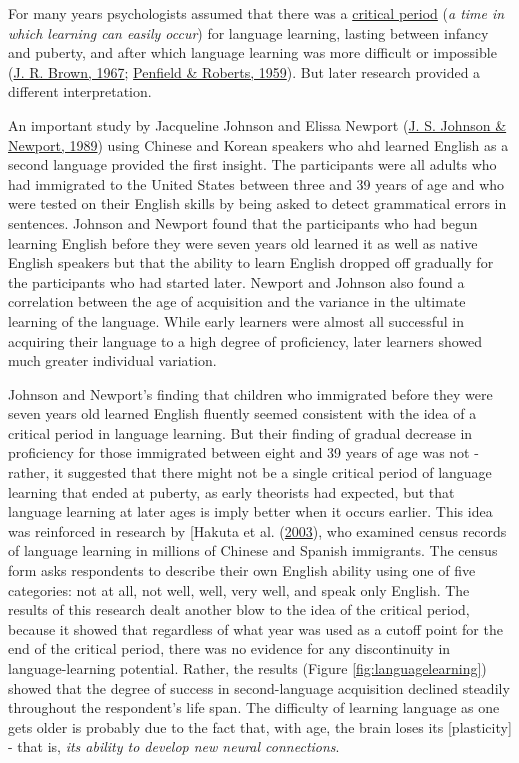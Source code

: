 \documentclass[
]{krantz}
\begin{document}
For many years psychologists assumed that there was a \protect\hyperlink{critical-period}{critical period} (\emph{a time in which learning can easily occur}) for language learning, lasting between infancy and puberty, and after which language learning was more difficult or impossible (\protect\hyperlink{ref-brown1967}{J. R. Brown, 1967}; \protect\hyperlink{ref-Penfield1959}{Penfield \& Roberts, 1959}). But later research provided a different interpretation.

An important study by Jacqueline Johnson and Elissa Newport (\protect\hyperlink{ref-Johnson1989}{J. S. Johnson \& Newport, 1989}) using Chinese and Korean speakers who ahd learned English as a second language provided the first insight. The participants were all adults who had immigrated to the United States between three and 39 years of age and who were tested on their English skills by being asked to detect grammatical errors in sentences. Johnson and Newport found that the participants who had begun learning English before they were seven years old learned it as well as native English speakers but that the ability to learn English dropped off gradually for the participants who had started later. Newport and Johnson also found a correlation between the age of acquisition and the variance in the ultimate learning of the language. While early learners were almost all successful in acquiring their language to a high degree of proficiency, later learners showed much greater individual variation.

Johnson and Newport's finding that children who immigrated before they were seven years old learned English fluently seemed consistent with the idea of a critical period in language learning. But their finding of gradual decrease in proficiency for those immigrated between eight and 39 years of age was not - rather, it suggested that there might not be a single critical period of language learning that ended at puberty, as early theorists had expected, but that language learning at later ages is imply better when it occurs earlier. This idea was reinforced in research by {[}Hakuta et al. (\protect\hyperlink{ref-Hakuta2003}{2003}), who examined census records of language learning in millions of Chinese and Spanish immigrants. The census form asks respondents to describe their own English ability using one of five categories: not at all, not well, well, very well, and speak only English. The results of this research dealt another blow to the idea of the critical period, because it showed that regardless of what year was used as a cutoff point for the end of the critical period, there was no evidence for any discontinuity in language-learning potential. Rather, the results (Figure \ref{fig:languagelearning}) showed that the degree of success in second-language acquisition declined steadily throughout the respondent's life span. The difficulty of learning language as one gets older is probably due to the fact that, with age, the brain loses its {[}plasticity{]} - that is, \emph{its ability to develop new neural connections}.
\end{document}
